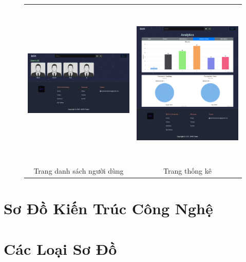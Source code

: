 \begin{center}
\begin{figure}[H]
\begin{tabular}{cc}
  \includegraphics[width=8.5cm,height=8cm]{./imgs/layouts/users} &   \includegraphics[width=8.5cm,height=8cm]{./imgs/layouts/statistics} \\
Trang danh sách người dùng & Trang thống kê \\[6pt]
\end{tabular}
\end{figure}
\end{center}



\section{Sơ Đồ Kiến Trúc Công Nghệ}

\section{Các Loại Sơ Đồ}
